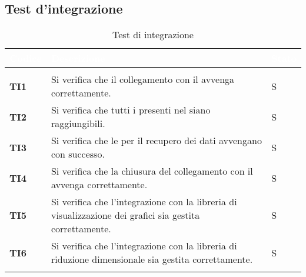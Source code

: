 \subsection{Test d'integrazione}
{

\renewcommand{\arraystretch}{1.5}
\renewcommand\extrarowheight{1.5pt}
\setlength\arrayrulewidth{1pt}
\begin{longtable}{ C{1.5cm} | C{12cm}| C{1.5cm} } 
		\textcolor{white}{\textbf{Codice}} & 
		\textcolor{white}{\textbf{Descrizione}} & 
		\textcolor{white}{\textbf{Stato}} \\
		\endfirsthead
		\\
	    \endfoot
	    \endlastfoot

\textbf{TI1} & 
Si verifica che il collegamento con il  avvenga correttamente. & 
S\\

\textbf{TI2} & 
Si verifica che tutti i  presenti nel  siano raggiungibili. & 
S\\

\textbf{TI3} & 
Si verifica che le  per il recupero dei dati avvengano con successo. & 
S\\

\textbf{TI4} & 
Si verifica che la chiusura del collegamento con il  avvenga correttamente. & 
S\\

\textbf{TI5} & 
Si verifica che l'integrazione con la libreria di visualizzazione dei grafici sia gestita correttamente. & 
S\\

\textbf{TI6} & 
Si verifica che l'integrazione con la libreria di riduzione dimensionale sia gestita correttamente. & 
S\\

\caption{Test di integrazione}
\label{testIntegrazione}
\end{longtable}
}

